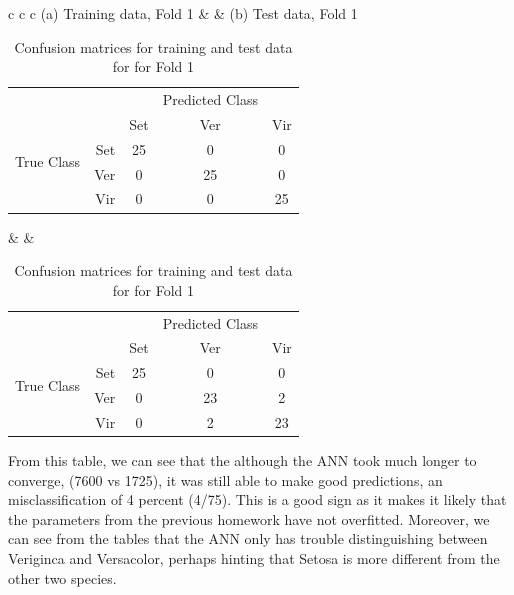 \documentclass[epsfig]{article}
\begin{document}
 \begin{table}[htbp] 
 

\center
  \label{tab:NP}
\end{table}

\begin{table}[htp]
\caption{Confusion matrices for training and test data for for Fold 1}
\begin{tabular}{c c c}
	(a) Training data, Fold 1 & &
	(b) Test data, Fold 1 \\
		\begin{tabular} {rrccc}
	&	&	&Predicted Class&	\\
	\multirow{4}{*}{\begin{sideways} True Class \end{sideways}}	&	&Set	&Ver	&Vir	\\
	&Set	&25	&0	&0	\\
	&Ver	&0	&25	&0	\\
	&Vir	&0	&0	&25	\\
	\end{tabular}  & &
	\begin{tabular} {rrccc}
	&		&		&Predicted Class&		\\
	\multirow{4}{*}{\begin{sideways} True Class \end{sideways}}	&		&Set	&Ver	&Vir	\\
	&Set	&25		&0		&0		\\
	&Ver	&0		&23		&2		\\
	&Vir	&0		&2		&23		\\
	\end{tabular}  
\end{tabular}  	
\end{table}
From this table, we can see that the although the ANN took much longer to converge, (7600 vs 1725), it was still able to make good predictions, an misclassification of 4 percent (4/75). This is a good sign as it makes it likely that the parameters from the previous homework have not overfitted. Moreover, we can see from the tables that the ANN only has trouble distinguishing between Veriginca and Versacolor, perhaps hinting that Setosa is more different from the other two species. 
\end{document}
